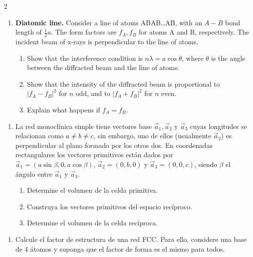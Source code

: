 \documentclass{article}
\begin{document}
\begin{multicols}{2}
\begin{enumerate}[label={{\textcolor{trueblue}{\textbf{Ej}. \arabic*.0}}}, start=5]
    \item \textbf{Diatomic line.} Consider a line of atoms ABAB…AB, with an $A-B$ bond length of $\tfrac{1}{2}a$. The form factors are $f_A, f_B$ for atoms A and B, respectively. The incident beam of x-rays is perpendicular to the line of atoms.  
    \begin{enumerate}[label=(\alph*)]
        \item Show that the interference condition is $n\lambda = a \cos \theta$, where $\theta$ is the angle between the diffracted beam and the line of atoms.  
        \item Show that the intensity of the diffracted beam is proportional to $|f_A-f_B|^2$ for $n$ odd, and to $|f_A+f_B|^2$ for $n$ even.  
        \item Explain what happens if $f_A=f_B$.  
    \end{enumerate}
\end{enumerate}

\begin{enumerate}[label={{\textcolor{trueblue}{\textbf{Ej}. \arabic*.0}}}, start=6]
    \item La red monoclínica simple tiene vectores base \(\vec{a}_1, \vec{a}_2\) y \(\vec{a}_3\) cuyas longitudes se relacionan como \(a \neq b \neq c\), sin embargo, uno de ellos (usualmente \(\vec{a}_2\)) es perpendicular al plano formado por los otros dos. En coordenadas rectangulares los vectores primitivos están dados por \(\vec{a}_1 = (a \sin\beta, 0, a \cos\beta)\), \(\vec{a}_2 = (0, b, 0)\) y \(\vec{a}_3 = (0, 0, c)\), siendo \(\beta\) el ángulo entre \(\vec{a}_1\) y \(\vec{a}_3\).
    \begin{enumerate}[label=(\alph*)]
        \item Determine el volumen de la celda primitiva.
        \item Construya los vectores primitivos del espacio recíproco.
        \item Determine el volumen de la celda recíproca.
    \end{enumerate}
\end{enumerate}

\begin{enumerate}[label={{\textcolor{trueblue}{\textbf{Ej}. \arabic*.0}}}, start=7]
    \item Calcule el factor de estructura de una red FCC. Para ello, considere una base de 4 átomos y suponga que el factor de forma es el mismo para todos.
\end{enumerate}


\end{multicols}
\end{document}
